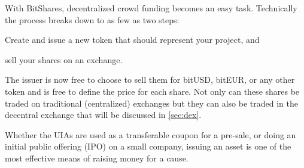 With BitShares, decentralized crowd funding becomes an easy task. Technically
the process breaks down to as few as two steps:
\begin{inparaenum}[(a)]
 \item Create and issue a new token that should represent your project, and 
 \item sell your shares on an exchange.
\end{inparaenum}
The issuer is now free to choose to sell them for bitUSD, bitEUR, or any other
token and is free to define the price for each share. Not only can these shares
be traded on traditional (centralized) exchanges but they can also be traded in
the decentral exchange that will be discussed in \cref{sec:dex}.

Whether the UIAs are used as a transferable coupon for a pre-sale, or doing an
initial public offering (IPO) on a small company, issuing an asset is one of
the most effective means of raising money for a cause.

